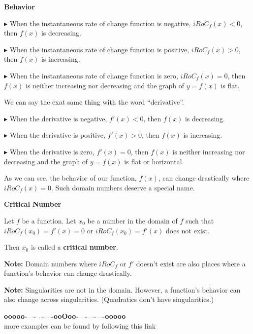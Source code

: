 \documentclass{ximera}
\begin{document}
\begin{conclusion}  \textbf{\textcolor{green!50!black}{Behavior}}

$\blacktriangleright$ When the instantaneous rate of change function is negative, $iRoC_f(x) < 0$, then $f(x)$ is decreasing. 

$\blacktriangleright$ When the instantaneous rate of change function is positive, $iRoC_f(x) > 0$, then $f(x)$ is increasing. 

$\blacktriangleright$ When the instantaneous rate of change function is zero, $iRoC_f(x) = 0$, then $f(x)$ is neither increasing nor decreasing and the graph of $y = f(x)$ is flat. 


We can say the exat same thing with the word ``derivative''. 



$\blacktriangleright$ When the derivative is negative, $f'(x) < 0$, then $f(x)$ is decreasing. 

$\blacktriangleright$ When the derivative is positive, $f'(x) > 0$, then $f(x)$ is increasing. 

$\blacktriangleright$ When the derivative is zero, $f'(x) = 0$, then $f(x)$ is neither increasing nor decreasing and the graph of $y = f(x)$ is flat or horizontal. 



\end{conclusion}


As we can see, the behavior of our function, $f(x)$, can change drastically where $iRoC_f(x) = 0$.  Such domain numbers deserve a special name.



\begin{idea} \textbf{\textcolor{blue!55!black}{Critical Number}}  


Let $f$ be a function. Let $x_0$ be a number in the domain of $f$ such that $iRoC_f(x_0) = f'(x) = 0$ or $iRoC_f(x_0) = f'(x)$ does not exist.

Then $x_0$ is called a \textbf{critical number}.


\end{idea}

\textbf{Note: } Domain numbers where $iRoC_f$ or $f'$ doesn't exist are also places where a function's behavior can change drastically.

\textbf{Note: } Singularities are not in the domain. However, a function's behavior can also change across singularities. (Quadratics don't have singularities.)













\begin{center}
\textbf{\textcolor{green!50!black}{ooooo-=-=-=-ooOoo-=-=-=-ooooo}} \\

more examples can be found by following this link\\ 

\end{center}
\end{document}
